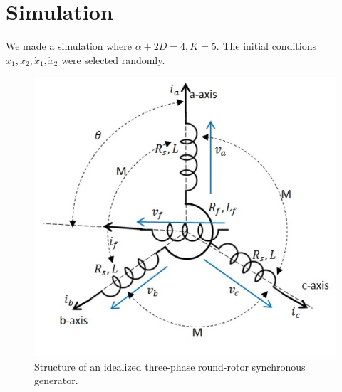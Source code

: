 \documentclass[10pt,onecolumn,twoside,letter]{IEEEtran}
\theoremstyle{plain}
\begin{document}
\section{Simulation}\label{sec:Simulation}
We made a simulation where $\alpha+2D = 4,  K = 5$. The initial conditions $x_1, x_2, \dot x_1,\dot x_2$ were selected randomly.

\begin{figure}
\begin{centering}
\includegraphics[scale=0.65]{FIG1} 
\par\end{centering}
\caption{\label{fig:Struct}Structure of an idealized three-phase
round-rotor synchronous generator.}
\end{figure}



\end{document}
